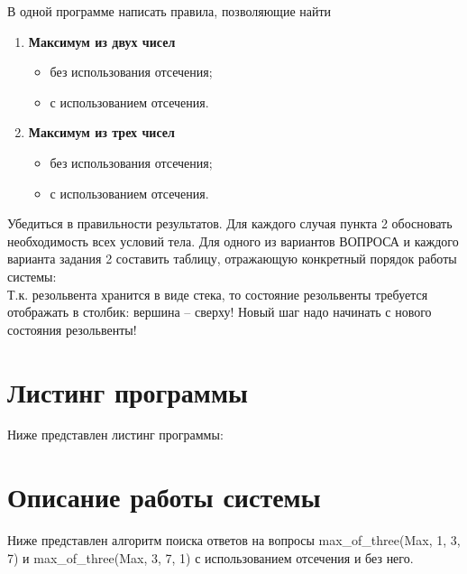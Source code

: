 \Large В одной программе написать правила, позволяющие найти 
\begin{enumerate}
	\item \textbf{Максимум из двух чисел} 	
	\begin{itemize}  \item без использования отсечения;
		\item с использованием отсечения.\end{itemize}
	\item \textbf{Максимум из трех чисел}  	\begin{itemize}  \item без использования отсечения;
		\item с использованием отсечения.\end{itemize}
\end{enumerate}
Убедиться в правильности результатов.
Для каждого случая пункта 2 обосновать необходимость всех условий тела. 
Для одного из вариантов ВОПРОСА и каждого варианта задания 2 составить таблицу, отражающую конкретный порядок работы системы: \\
Т.к. резольвента хранится в виде стека, то состояние резольвенты требуется отображать в столбик: вершина – сверху! Новый шаг надо начинать с нового состояния резольвенты!


\newpage
\section*{Листинг программы}
Ниже представлен листинг программы:


\section*{Описание работы системы}

Ниже представлен алгоритм поиска ответов на вопросы max\_of\_three(Max, 1, 3, 7) и max\_of\_three(Max, 3, 7, 1) с использованием отсечения и без него.

